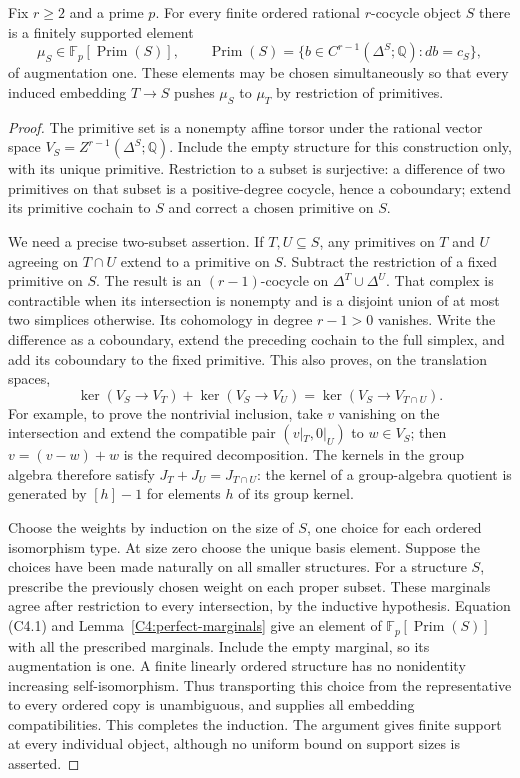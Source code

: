 \begin{lemma}
\label{C4:primitive-weights}
Fix $r\geq2$ and a prime $p$. For every finite ordered rational
$r$-cocycle object $S$ there is a finitely supported element
\[
 \mu_S\in\mathbb F_p[\operatorname{Prim}(S)],\qquad
 \operatorname{Prim}(S)=
 \{b\in C^{r-1}(\Delta^S;\mathbb Q):db=c_S\},
\]
of augmentation one. These elements may be chosen simultaneously
so that every induced embedding $T\to S$ pushes $\mu_S$ to $\mu_T$
by restriction of primitives.
\end{lemma}
\begin{proof}
The primitive set is a nonempty affine torsor under the rational
vector space $V_S=Z^{r-1}(\Delta^S;\mathbb Q)$. Include the empty
structure for this construction only, with its unique primitive.
Restriction to a subset is surjective: a difference of two primitives
on that subset is a positive-degree cocycle, hence a coboundary;
extend its primitive cochain to $S$ and correct a chosen primitive
on $S$.

We need a precise two-subset assertion. If $T,U\subseteq S$, any
primitives on $T$ and $U$ agreeing on $T\cap U$ extend to a primitive
on $S$. Subtract the restriction of a fixed primitive on $S$. The
result is an $(r-1)$-cocycle on
$\Delta^T\cup\Delta^U$. That complex is contractible when its
intersection is nonempty and is a disjoint union of at most two
simplices otherwise. Its cohomology in degree $r-1>0$ vanishes.
Write the difference as a coboundary, extend the preceding cochain
to the full simplex, and add its coboundary to the fixed primitive.
This also proves, on the translation spaces,
\[
 \ker(V_S\to V_T)+\ker(V_S\to V_U)
   =\ker(V_S\to V_{T\cap U}).                       \tag{C4.1}
\]
For example, to prove the nontrivial inclusion, take $v$ vanishing
on the intersection and extend the compatible pair $(v|_T,0|_U)$
to $w\in V_S$; then $v=(v-w)+w$ is the required decomposition.
The kernels in the group algebra therefore satisfy
$J_T+J_U=J_{T\cap U}$: the kernel of a group-algebra quotient is
generated by $[h]-1$ for elements $h$ of its group kernel.

Choose the weights by induction on the size of $S$, one choice for
each ordered isomorphism type. At size zero choose the unique basis
element. Suppose the choices have been made naturally on all smaller
structures. For a structure $S$, prescribe the previously chosen
weight on each proper subset. These marginals agree after restriction
to every intersection, by the inductive hypothesis. Equation (C4.1)
and Lemma~\ref{C4:perfect-marginals} give an element of
$\mathbb F_p[\operatorname{Prim}(S)]$ with all the prescribed
marginals. Include the empty marginal, so its augmentation is one.
A finite linearly ordered structure has no nonidentity increasing
self-isomorphism. Thus transporting this choice from the representative
to every ordered copy is unambiguous, and supplies all embedding
compatibilities. This completes the induction. The argument gives
finite support at every individual object, although no uniform bound
on support sizes is asserted.
\end{proof}

